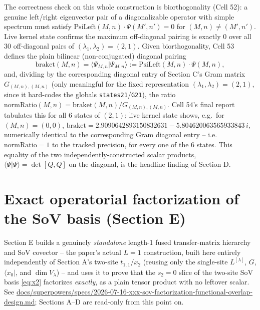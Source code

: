 \documentclass[11pt]{article}
\begin{document}
The correctness check on this whole construction is biorthogonality (Cell 52): a genuine left/right
eigenvector pair of a diagonalizable operator with simple spectrum must satisfy
$\mathrm{PsiLeft}(M,n)\cdot\Psi(M',n')=0$ for $(M,n)\neq(M',n')$. Live kernel state confirms the
maximum off-diagonal pairing is exactly $0$ over all 30 off-diagonal pairs of $(\lambda_1,\lambda_2)=(2,1)$.
Given biorthogonality, Cell 53 defines the plain bilinear (non-conjugated) diagonal pairing
\[
  \mathrm{braket}(M,n) = \langle\Psi_{M,n}|\Psi_{M,n}\rangle := \mathrm{PsiLeft}(M,n)\cdot\Psi(M,n),
\]
and, dividing by the corresponding diagonal entry of Section C's Gram matrix
$G_{(M,n),(M,n)}$ (only meaningful for the fixed representation $(\lambda_1,\lambda_2)=(2,1)$, since
it hard-codes the globals \texttt{states21}/\texttt{G21}), the ratio
$\mathrm{normRatio}(M,n) = \mathrm{braket}(M,n)/G_{(M,n),(M,n)}$. Cell 54's final report tabulates
this for all 6 states of $(2,1)$; live kernel state shows, e.g.\ for $(M,n)=(0,0)$,
$\mathrm{braket} = 2.9090642893150832631 - 5.804620063565933843\,i$, numerically identical to the
corresponding Gram diagonal entry -- i.e.\ $\mathrm{normRatio}=1$ to the tracked precision, for
every one of the 6 states. This equality of the two independently-constructed scalar products,
$\langle\Psi|\Psi\rangle = \det[Q,Q]$ on the diagonal, is the headline finding of Section D.

\section{Exact operatorial factorization of the SoV basis (Section E)}
\label{sec:factorization}

Section E builds a genuinely \emph{standalone} length-1 fused transfer-matrix hierarchy and SoV
covector -- the paper's actual $L=1$ construction, built here entirely independently of Section A's
two-site $t_{1,1}$/$x_2$ (reusing only the single-site $L^{[\lambda]}$, $G$,
$\langle x_0|$, and $\dim V_\lambda$) -- and uses it to prove that the $s_2=0$ slice of the two-site
SoV basis \eqref{eq:x2} factorizes \emph{exactly}, as a plain tensor product with no leftover
scalar. See
\url{docs/superpowers/specs/2026-07-16-xxx-sov-factorization-functional-overlap-design.md};
Sections A--D are read-only from this point on.
\end{document}
